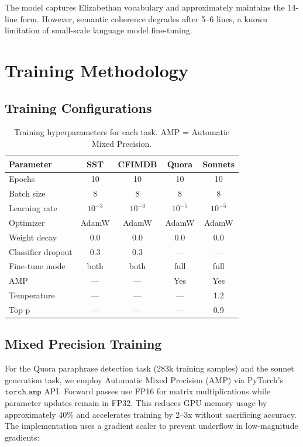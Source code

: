 \documentclass[11pt,a4paper]{article}
\begin{document}
The model captures Elizabethan vocabulary and approximately maintains the 14-line form. However, semantic coherence degrades after 5--6 lines, a known limitation of small-scale language model fine-tuning.

\section{Training Methodology}

\subsection{Training Configurations}

\begin{table}[H]
\centering
\begin{tabular}{lcccc}
\toprule
\textbf{Parameter} & \textbf{SST} & \textbf{CFIMDB} & \textbf{Quora} & \textbf{Sonnets} \\
\midrule
Epochs & 10 & 10 & 10 & 10 \\
Batch size & 8 & 8 & 8 & 8 \\
Learning rate & $10^{-3}$ & $10^{-3}$ & $10^{-5}$ & $10^{-5}$ \\
Optimizer & AdamW & AdamW & AdamW & AdamW \\
Weight decay & 0.0 & 0.0 & 0.0 & 0.0 \\
Classifier dropout & 0.3 & 0.3 & --- & --- \\
Fine-tune mode & both & both & full & full \\
AMP & --- & --- & Yes & Yes \\
Temperature & --- & --- & --- & 1.2 \\
Top-p & --- & --- & --- & 0.9 \\
\bottomrule
\end{tabular}
\caption{Training hyperparameters for each task. AMP = Automatic Mixed Precision.}
\label{tab:hparams}
\end{table}

\subsection{Mixed Precision Training}

For the Quora paraphrase detection task (283k training samples) and the sonnet generation task, we employ Automatic Mixed Precision (AMP) via PyTorch's $\texttt{torch.amp}$ API. Forward passes use FP16 for matrix multiplications while parameter updates remain in FP32. This reduces GPU memory usage by approximately 40\% and accelerates training by 2--3x without sacrificing accuracy. The implementation uses a gradient scaler to prevent underflow in low-magnitude gradients:
\end{document}
